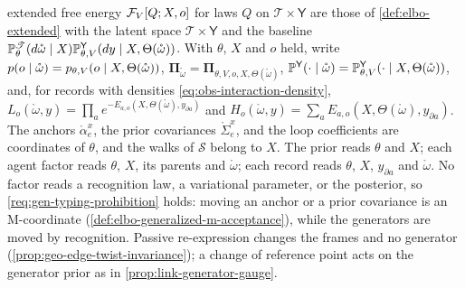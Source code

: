 extended free energy $\mathcal F_V[Q;X,o]$ for laws $Q$ on $\mathscr T\times\mathsf Y$ are those of
\cref{def:elbo-extended} with the latent space $\mathscr T\times\mathsf Y$ and the baseline
$\mathbb P^{\mathscr T}_\theta(d\mathring\omega\mid X)\mathbb P^{\mathsf Y}_{\theta,V}(dy\mid X,\Theta(\mathring\omega))$.
With $\theta$, $X$ and $o$ held, write
$p(o\mid\mathring\omega)=p_{\theta,V}(o\mid X,\Theta(\mathring\omega))$,
$\boldsymbol\Pi_{\mathring\omega}=\boldsymbol\Pi_{\theta,V,o,X,\Theta(\mathring\omega)}$,
$\mathbb P^{\mathsf Y}(\cdot\mid\mathring\omega)=\mathbb P^{\mathsf Y}_{\theta,V}(\cdot\mid X,\Theta(\mathring\omega))$,
and, for records with densities \eqref{eq:obs-interaction-density},
$L_o(\mathring\omega,y)=\prod_{a}e^{-E_{a,o}(X,\Theta(\mathring\omega),y_{\partial a})}$ and
$H_o(\mathring\omega,y)=\sum_aE_{a,o}(X,\Theta(\mathring\omega),y_{\partial a})$. The anchors
$\mathring\alpha^x_e$, the prior covariances $\mathring\Sigma^x_e$, and the loop coefficients are coordinates
of $\theta$, and the walks of $\mathscr S$ belong to $X$. The prior reads $\theta$ and $X$; each agent factor
reads $\theta$, $X$, its parents and $\mathring\omega$; each record reads $\theta$, $X$, $y_{\partial a}$ and
$\mathring\omega$. No factor reads a recognition law, a variational parameter, or the posterior, so
\cref{req:gen-typing-prohibition} holds: moving an anchor or a prior covariance is an M-coordinate
(\cref{def:elbo-generalized-m-acceptance}), while the generators are moved by recognition. Passive
re-expression changes the frames and no generator (\cref{prop:geo-edge-twist-invariance}); a change of
reference point acts on the generator prior as in \cref{prop:link-generator-gauge}.

